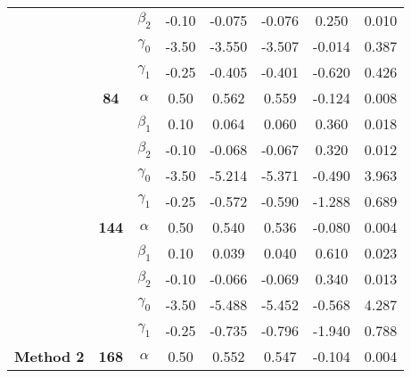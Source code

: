 \begin{table}[h]
\begin{tabular}[t]{>{}c>{}ccccccc}
 &  & $\beta_2$ & -0.10 & -0.075 & -0.076 & 0.250 & 0.010\\

 &  & $\gamma_0$ & -3.50 & -3.550 & -3.507 & -0.014 & 0.387\\

 &  & $\gamma_1$ & -0.25 & -0.405 & -0.401 & -0.620 & 0.426\\

 & \multirow{-5}{*}{\centering\arraybackslash \textbf{84}} & $\alpha$ & 0.50 & 0.562 & 0.559 & -0.124 & 0.008\\

 &  & $\beta_1$ & 0.10 & 0.064 & 0.060 & 0.360 & 0.018\\

 &  & $\beta_2$ & -0.10 & -0.068 & -0.067 & 0.320 & 0.012\\

 &  & $\gamma_0$ & -3.50 & -5.214 & -5.371 & -0.490 & 3.963\\

 &  & $\gamma_1$ & -0.25 & -0.572 & -0.590 & -1.288 & 0.689\\

 & \multirow{-5}{*}{\centering\arraybackslash \textbf{144}} & $\alpha$ & 0.50 & 0.540 & 0.536 & -0.080 & 0.004\\

 &  & $\beta_1$ & 0.10 & 0.039 & 0.040 & 0.610 & 0.023\\

 &  & $\beta_2$ & -0.10 & -0.066 & -0.069 & 0.340 & 0.013\\

 &  & $\gamma_0$ & -3.50 & -5.488 & -5.452 & -0.568 & 4.287\\

 &  & $\gamma_1$ & -0.25 & -0.735 & -0.796 & -1.940 & 0.788\\

\multirow{-15}{*}{\centering\arraybackslash \textbf{Method 2}} & \multirow{-5}{*}{\centering\arraybackslash \textbf{168}} & $\alpha$ & 0.50 & 0.552 & 0.547 & -0.104 & 0.004\\
\bottomrule
\end{tabular}
\end{table}
